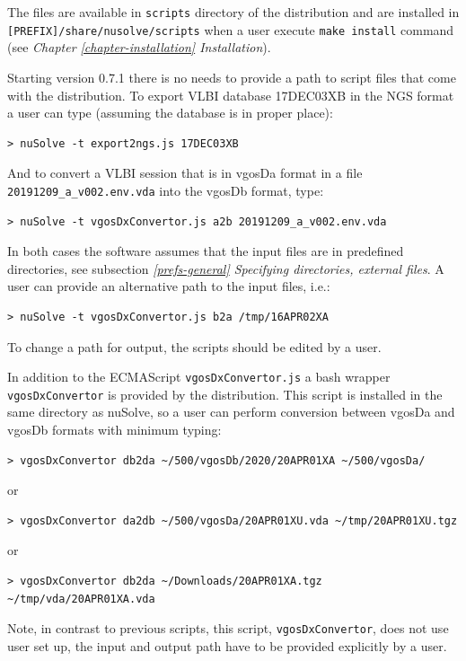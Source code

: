 \documentclass [10pt,letterpaper]{report}
\begin{document}
{{The files are available in {\tt scripts} directory of the distribution and are
installed in {\tt [PREFIX]/share/nusolve/scripts} when a user execute {\tt make install}
command (see \emph{Chapter \ref{chapter-installation} Installation}).

Starting version 0.7.1 there is no needs to provide a path to script files
that come with the distribution. To export VLBI database 17DEC03XB in the NGS
format a user can type (assuming the database is in proper place):
\begin{verbatim}
> nuSolve -t export2ngs.js 17DEC03XB
\end{verbatim}
And to convert a VLBI session that is in vgosDa format in a file
{\tt 20191209\_a\_v002.env.vda} into the vgosDb format, type:
\begin{verbatim}
> nuSolve -t vgosDxConvertor.js a2b 20191209_a_v002.env.vda
\end{verbatim}
In both cases the software assumes that the input files are in predefined
directories, see subsection
\emph{\ref{prefs-general} Specifying directories, external files}. A user can
provide an alternative path to the input files, i.e.:
\begin{verbatim}
> nuSolve -t vgosDxConvertor.js b2a /tmp/16APR02XA
\end{verbatim}
To change a path for output, the scripts should be edited by a user.

In addition to the ECMAScript {\tt vgosDxConvertor.js} a bash wrapper
{\tt vgosDxConvertor} is provided by the distribution. This script is
installed in the same directory as nuSolve, so a user can perform conversion
between vgosDa and vgosDb formats with minimum typing:
\begin{verbatim}
> vgosDxConvertor db2da ~/500/vgosDb/2020/20APR01XA ~/500/vgosDa/
\end{verbatim}
\noindent
or
\begin{verbatim}
> vgosDxConvertor da2db ~/500/vgosDa/20APR01XU.vda ~/tmp/20APR01XU.tgz
\end{verbatim}
\noindent
or
\begin{verbatim}
> vgosDxConvertor db2da ~/Downloads/20APR01XA.tgz ~/tmp/vda/20APR01XA.vda
\end{verbatim}
\noindent
Note, in contrast to previous scripts, this script, {\tt vgosDxConvertor},
does not use user set up, the input and output path have to be provided
explicitly by a user.












}}
\end{document}
